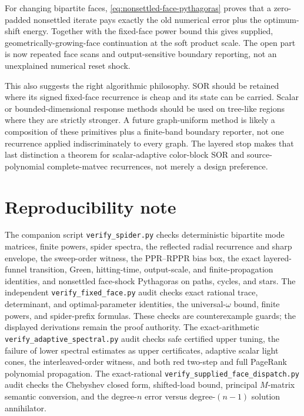 For changing bipartite faces,
\eqref{eq:nonsettled-face-pythagoras} proves that a zero-padded nonsettled
iterate pays exactly the old numerical error plus the optimum-shift energy.
Together with the fixed-face power bound this gives supplied,
geometrically-growing-face continuation at the soft product scale.  The open
part is now repeated face scans and output-sensitive boundary reporting, not
an unexplained numerical reset shock.

This also suggests the right algorithmic philosophy.  SOR should be retained
where its signed fixed-face recurrence is cheap and its state can be carried.
Scalar or bounded-dimensional response methods should be used on tree-like
regions where they are strictly stronger.  A future graph-uniform method is
likely a composition of these primitives plus a finite-band boundary
reporter, not one recurrence applied indiscriminately to every graph.  The
layered stop makes that last distinction a theorem for scalar-adaptive
color-block SOR and source-polynomial complete-matvec recurrences, not merely
a design preference.

\section*{Reproducibility note}

The companion script \texttt{verify\_spider.py} checks deterministic
bipartite mode matrices, finite powers, spider spectra, the reflected radial
recurrence and sharp envelope, the sweep-order witness, the PPR--RPPR bias
box, the exact layered-funnel transition, Green, hitting-time, output-scale,
and finite-propagation identities, and nonsettled face-shock Pythagoras on
paths, cycles, and stars.  The independent
\texttt{verify\_fixed\_face.py} audit checks exact rational trace,
determinant, and optimal-parameter identities, the universal-$\omega$ bound,
finite powers, and spider-prefix formulas.  These checks are counterexample
guards; the displayed derivations remain the proof authority.
The exact-arithmetic \texttt{verify\_adaptive\_spectral.py} audit checks safe
certified upper tuning, the failure of lower spectral estimates as upper
certificates, adaptive scalar light cones, the interleaved-order witness, and
both red two-step and full PageRank polynomial propagation.
The exact-rational \texttt{verify\_supplied\_face\_dispatch.py} audit checks
the Chebyshev closed form, shifted-load bound, principal $M$-matrix semantic
conversion, and the degree-$n$ error versus degree-$(n-1)$ solution
annihilator.

